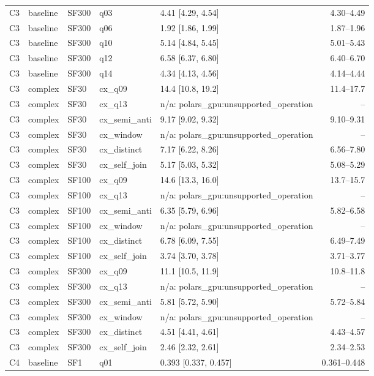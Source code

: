 \begin{longtable}{lllllr}
C3 & baseline & SF300 & q03 & 4.41 [4.29, 4.54] & 4.30--4.49 \\
C3 & baseline & SF300 & q06 & 1.92 [1.86, 1.99] & 1.87--1.96 \\
C3 & baseline & SF300 & q10 & 5.14 [4.84, 5.45] & 5.01--5.43 \\
C3 & baseline & SF300 & q12 & 6.58 [6.37, 6.80] & 6.40--6.70 \\
C3 & baseline & SF300 & q14 & 4.34 [4.13, 4.56] & 4.14--4.44 \\
C3 & complex & SF30 & cx\_q09 & 14.4 [10.8, 19.2] & 11.4--17.7 \\
C3 & complex & SF30 & cx\_q13 & n/a: polars\_gpu:unsupported\_operation & -- \\
C3 & complex & SF30 & cx\_semi\_anti & 9.17 [9.02, 9.32] & 9.10--9.31 \\
C3 & complex & SF30 & cx\_window & n/a: polars\_gpu:unsupported\_operation & -- \\
C3 & complex & SF30 & cx\_distinct & 7.17 [6.22, 8.26] & 6.56--7.80 \\
C3 & complex & SF30 & cx\_self\_join & 5.17 [5.03, 5.32] & 5.08--5.29 \\
C3 & complex & SF100 & cx\_q09 & 14.6 [13.3, 16.0] & 13.7--15.7 \\
C3 & complex & SF100 & cx\_q13 & n/a: polars\_gpu:unsupported\_operation & -- \\
C3 & complex & SF100 & cx\_semi\_anti & 6.35 [5.79, 6.96] & 5.82--6.58 \\
C3 & complex & SF100 & cx\_window & n/a: polars\_gpu:unsupported\_operation & -- \\
C3 & complex & SF100 & cx\_distinct & 6.78 [6.09, 7.55] & 6.49--7.49 \\
C3 & complex & SF100 & cx\_self\_join & 3.74 [3.70, 3.78] & 3.71--3.77 \\
C3 & complex & SF300 & cx\_q09 & 11.1 [10.5, 11.9] & 10.8--11.8 \\
C3 & complex & SF300 & cx\_q13 & n/a: polars\_gpu:unsupported\_operation & -- \\
C3 & complex & SF300 & cx\_semi\_anti & 5.81 [5.72, 5.90] & 5.72--5.84 \\
C3 & complex & SF300 & cx\_window & n/a: polars\_gpu:unsupported\_operation & -- \\
C3 & complex & SF300 & cx\_distinct & 4.51 [4.41, 4.61] & 4.43--4.57 \\
C3 & complex & SF300 & cx\_self\_join & 2.46 [2.32, 2.61] & 2.34--2.53 \\
C4 & baseline & SF1 & q01 & 0.393 [0.337, 0.457] & 0.361--0.448 \\

\end{longtable}
